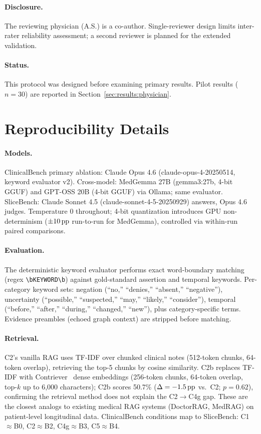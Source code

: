 \paragraph{Disclosure.} The reviewing physician (A.S.) is a co-author.
Single-reviewer design limits inter-rater reliability assessment; a second reviewer is planned for the extended validation.

\paragraph{Status.} This protocol was designed before examining primary results.
Pilot results ($n=30$) are reported in Section~\ref{sec:results:physician}.


\section{Reproducibility Details}
\label{app:reproducibility}

\paragraph{Models.} ClinicalBench primary ablation: Claude Opus 4.6 (claude-opus-4-20250514, keyword evaluator v2).
Cross-model: MedGemma 27B (gemma3:27b, 4-bit GGUF) and GPT-OSS 20B (4-bit GGUF) via Ollama; same evaluator.
SliceBench: Claude Sonnet 4.5 (claude-sonnet-4-5-20250929) answers, Opus 4.6 judges.
Temperature 0 throughout; 4-bit quantization introduces GPU non-determinism ($\pm 10\,\text{pp}$ run-to-run for MedGemma), controlled via within-run paired comparisons.

\paragraph{Evaluation.} The deterministic keyword evaluator performs exact word-boundary matching (regex \verb|\bKEYWORD\b|) against gold-standard assertion and temporal keywords.
Per-category keyword sets: negation (``no,'' ``denies,'' ``absent,'' ``negative''), uncertainty (``possible,'' ``suspected,'' ``may,'' ``likely,'' ``consider''), temporal (``before,'' ``after,'' ``during,'' ``changed,'' ``new''), plus category-specific terms.
Evidence preambles (echoed graph context) are stripped before matching.

\paragraph{Retrieval.} C2's vanilla RAG uses TF-IDF over chunked clinical notes (512-token chunks, 64-token overlap), retrieving the top-5 chunks by cosine similarity.
C2b replaces TF-IDF with Contriever~\cite{izacard2022contriever} dense embeddings (256-token chunks, 64-token overlap, top-$k$ up to 6{,}000 characters); C2b scores 50.7\% ($\Delta = -1.5\,\text{pp}$ vs.\ C2; $p = 0.62$), confirming the retrieval method does not explain the C2$\to$C4g gap.
These are the closest analogs to existing medical RAG systems (DoctorRAG, MedRAG) on patient-level longitudinal data.
ClinicalBench conditions map to SliceBench: C1$\!\approx\!$B0, C2$\!\approx\!$B2, C4g$\!\approx\!$B3, C5$\!\approx\!$B4.


